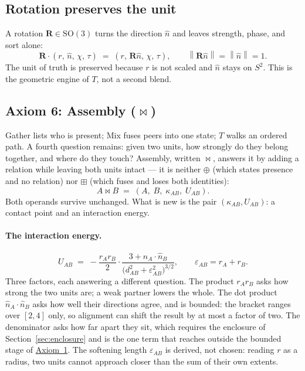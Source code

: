 \documentclass[12pt, a4paper]{article}
\providecommand{\norm}[1]{\left\lVert#1\right\rVert}
\begin{document}
\subsection{Rotation preserves the unit}
\label{subsec:axiom_rotation}
A rotation $\mathbf{R} \in \mathrm{SO}(3)$ turns the direction $\hat n$ and leaves strength, phase, and sort alone:
\begin{equation}
    \mathbf{R}\cdot(r,\,\hat n,\,\chi,\,\tau)
    \;=\;
    (r,\,\mathbf{R}\hat n,\,\chi,\,\tau),
    \qquad
    \norm{\mathbf{R}\hat n} = \norm{\hat n} = 1.
\end{equation}
The unit of truth is preserved because $r$ is not scaled and $\hat n$ stays on $S^2$. This is the geometric engine of $T$, not a second blend.

\subsection{Axiom 6: Assembly (\texorpdfstring{$\bowtie$}{assembly})}
\label{subsec:axiom_assembly}
Gather lists who is present; Mix fuses peers into one state; $T$
walks an ordered path. A fourth question remains: given two units,
how strongly do they belong together, and where do they touch?
Assembly, written $\bowtie$, answers it by adding a relation while
leaving both units intact --- it is neither $\oplus$ (which states
presence and no relation) nor $\boxplus$ (which fuses and loses both
identities):
\begin{equation}
    A \bowtie B \;=\; (A,\;B,\;\kappa_{AB},\;U_{AB}).
    \label{eq:assembly_signature}
\end{equation}
Both operands survive unchanged. What is new is the pair
$(\kappa_{AB}, U_{AB})$: a contact point and an interaction energy.

\paragraph{The interaction energy.}
\begin{equation}
    U_{AB} \;=\; -\frac{r_A r_B}{2}\cdot
    \frac{3+\hat n_A\cdot\hat n_B}
         {\bigl(d_{AB}^2+\varepsilon_{AB}^2\bigr)^{3/2}},
    \qquad
    \varepsilon_{AB} = r_A + r_B.
    \label{eq:assembly_energy}
\end{equation}
Three factors, each answering a different question. The product
$r_Ar_B$ asks how strong the two units are; a weak partner lowers the
whole. The dot product $\hat n_A\cdot\hat n_B$ asks how well their
directions agree, and is bounded: the bracket ranges over $[2,4]$
only, so alignment can shift the result by at most a factor of two.
The denominator asks how far apart they sit, which requires the
enclosure of Section~\ref{sec:enclosure} and is the one term that
reaches outside the bounded stage of \hyperref[subsec:axiom1]{Axiom~1}. The
softening length $\varepsilon_{AB}$ is derived, not chosen: reading
$r$ as a radius, two units cannot approach closer than the sum of
their own extents.
\end{document}
